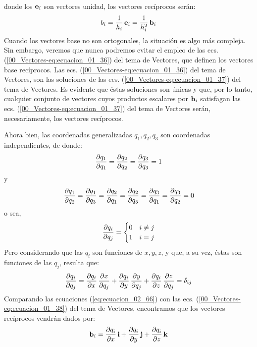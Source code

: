 \documentclass[12pt]{article}
\begin{document}
donde los $\vb{e}_{i}$ son vectores unidad, los vectores recíprocos serán:
\begin{align}
    b_{i} = \dfrac{1}{h_{i}} \, \vb{e}_{i} = \dfrac{1}{h_{i}^{2}} \, \vb{b}_{i}
    \label{eq:ecuacion_02_64}
\end{align}
Cuando los vectores base no son ortogonales, la situación es algo más compleja. Sin embargo, veremos que nunca podremos evitar el empleo de las ecs. (\ref{00_Vectores-eq:ecuacion_01_36}) del tema de Vectores, que definen los vectores base recíprocos. Las ecs. (\ref{00_Vectores-eq:ecuacion_01_36}) del tema de Vectores, son las soluciones de las ecs. (\ref{00_Vectores-eq:ecuacion_01_37}) del tema de Vectores. Es evidente que éstas soluciones son únicas y que, por lo tanto, cualquier conjunto de vectores cuyos productos escalares por $\vb{b}_{i}$ satisfagan las ecs. (\ref{00_Vectores-eq:ecuacion_01_37}) del tema de Vectores serán, necesariamente, los vectores recíprocos. 
\par
Ahora bien, las coordenadas generalizadas $q_{1}, q_{2}, q_{3}$ son coordenadas independientes, de donde:
\begin{align*}
    \pdv{q_{1}}{q_{1}} = \pdv{q_{2}}{q_{2}} = \pdv{q_{3}}{q_{3}} = 1
\end{align*} 
y
\begin{align*}
    \pdv{q_{1}}{q_{2}} = \pdv{q_{1}}{q_{3}} = \pdv{q_{2}}{q_{1}} = \pdv{q_{2}}{q_{3}} = \pdv{q_{3}}{q_{1}} = \pdv{q_{3}}{q_{2}} = 0
\end{align*}
o sea,
\begin{align}
    \pdv{q_{i}}{q_{j}} = \begin{cases}
        0 & i \neq j \\
        1 & i = j
    \end{cases}
    \label{eq:ecuacion_02_65}
\end{align}
Pero considerando que las $q_{i}$ son funciones de $x, y, z$, y que, a su vez, éstas son funciones de las $q_{j}$, resulta que:
\begin{align}
    \pdv{q_{i}}{q_{j}} = \pdv{q_{i}}{x} \, \pdv{x}{q_{j}} + \pdv{q_{i}}{y} \, \pdv{y}{q_{j}} + \pdv{q_{i}}{z} \, \pdv{z}{q_{j}} = \delta_{ij}
    \label{eq:ecuacion_02_66} 
\end{align}
Comparando las ecuaciones (\ref{eq:ecuacion_02_66}) con las ecs. (\ref{00_Vectores-eq:ecuacion_01_38}) del tema de Vectores, encontramos que los vectores recíprocos vendrán dados por:
\begin{align}
    \vb{b}_{i} = \pdv{q_{i}}{x} \, \vb{i} + \pdv{q_{i}}{y} \, \vb{j} + \pdv{q_{i}}{z} \, \vb{k}
    \label{eq:ecuacion_02_67}
\end{align}
\end{document}
